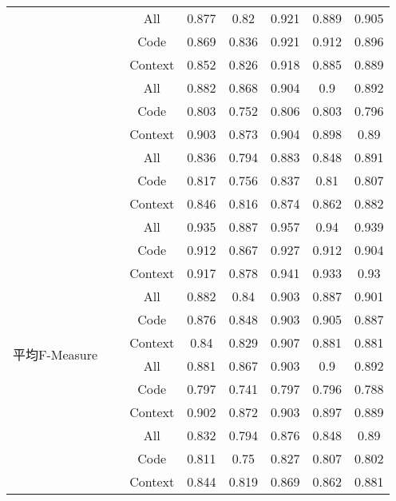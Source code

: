 \begin{table} [htbp]
\begin{tabular}{cccccccc}
\cline{2-8}
&~\multirow{3}{*}{jEdit}
            &   All     & 0.877    & 0.82   & 0.921 & 0.889 & 0.905 \\
            &   & Code    & 0.869    & 0.836  & 0.921 & 0.912 & 0.896 \\
            &            & Context & 0.852    & 0.826  & 0.918 & 0.885 & 0.889 \\
\cline{2-8}
&~\multirow{3}{*}{jFreeChart} 
            & All     & 0.882    & 0.868  & 0.904 & 0.9   & 0.892 \\
            &  & Code    & 0.803    & 0.752  & 0.806 & 0.803 & 0.796 \\
            &            & Context & 0.903    & 0.873  & 0.904 & 0.898 & 0.89  \\
\cline{2-8}
&~\multirow{3}{*}{Tuxguitar} 
            & All     & 0.836    & 0.794  & 0.883 & 0.848 & 0.891 \\
            &   & Code    & 0.817    & 0.756  & 0.837 & 0.81  & 0.807 \\
            &            & Context & 0.846    & 0.816  & 0.874 & 0.862 & 0.882 \\
\hline
\multirow{12}{*}{平均F-Measure }
&~\multirow{3}{*}{ArgoUML}
            & All     & 0.935    & 0.887  & 0.957 & 0.94  & 0.939 \\
            &   & Code    & 0.912    & 0.867  & 0.927 & 0.912 & 0.904 \\
            &            & Context & 0.917    & 0.878  & 0.941 & 0.933 & 0.93  \\
\cline{2-8}
&~\multirow{3}{*}{jEdit} 
		& All     & 0.882    & 0.84   & 0.903 & 0.887 & 0.901 \\
            &       & Code    & 0.876    & 0.848  & 0.903 & 0.905 & 0.887 \\
            &            & Context & 0.84     & 0.829  & 0.907 & 0.881 & 0.881 \\
\cline{2-8}
&~\multirow{3}{*}{jFreeChart} 
            &  All     & 0.881    & 0.867  & 0.903 & 0.9   & 0.892 \\
            &  & Code    & 0.797    & 0.741  & 0.797 & 0.796 & 0.788 \\
            &            & Context & 0.902    & 0.872  & 0.903 & 0.897 & 0.889 \\
\cline{2-8}
&~\multirow{3}{*}{Tuxguitar} 
            &  All     & 0.832    & 0.794  & 0.876 & 0.848 & 0.89  \\
            &  & Code    & 0.811    & 0.75   & 0.827 & 0.807 & 0.802 \\
            &            & Context & 0.844    & 0.819  & 0.869 & 0.862 & 0.881\\
\bottomrule[1.5pt]
\end{tabular}
\end{table} 

